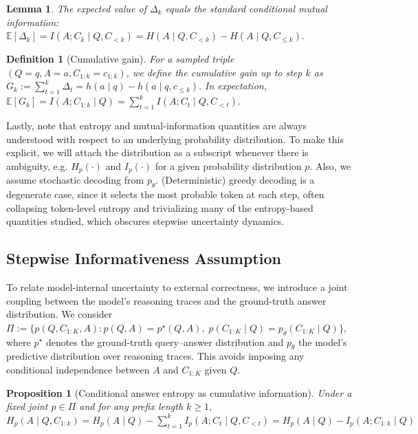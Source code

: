 \documentclass{article}
\newtheorem{proposition}{Proposition}
\newtheorem{definition}{Definition}
\newtheorem{lemma}{Lemma}
\begin{document}
\begin{lemma}
The expected value of $\Delta_k$ equals the standard conditional mutual information: $\mathbb{E}[\Delta_k] = I(A; C_k \mid Q, C_{<k}) = H(A \mid Q, C_{<k}) - H(A \mid Q, C_{\le k}).$
\label{cl:exp_delta_is_I}
\end{lemma}

\begin{definition}[Cumulative gain]
    For a sampled triple $(Q=q,A=a,C_{1:k}=c_{1:k})$, we define the \emph{cumulative gain up to step $k$} as $G_k := \sum_{t=1}^k \Delta_t=h(a\mid q)-h(a\mid q,c_{\leq k}).$ In expectation, $\mathbb{E}[G_k]=I(A;C_{1:k} \mid Q)=\sum_{t=1}^k I(A;C_t \mid Q, C_{<t}).$
    \label{def:cumulativegain}
\end{definition}

Lastly, note that entropy and mutual-information quantities are always understood with respect to an underlying probability distribution. To make this explicit, we will attach the distribution as a subscript whenever there is ambiguity, e.g. $H_{p}(\cdot)$ and $I_{p}(\cdot)$ for a given probability distribution $p$. Also, we assume stochastic decoding from $p_\theta$. (Deterministic) greedy decoding is a degenerate case, since it selects the most probable token at each step, often collapsing token-level entropy and trivializing many of the entropy-based quantities studied, which obscures stepwise uncertainty dynamics.

\subsection{Stepwise Informativeness Assumption}

To relate model-internal uncertainty to external correctness, we introduce a joint coupling between the model’s reasoning traces and the ground-truth answer distribution. We consider
\(
\Pi := \{p(Q,C_{1:K},A) : p(Q,A)=p^\star(Q,A),\; p(C_{1:K}\mid Q)=p_\theta(C_{1:K}\mid Q)\},
\)
where $p^\star$ denotes the ground-truth query–answer distribution and $p_\theta$ the model’s predictive distribution over reasoning traces. This avoids imposing any conditional independence between $A$ and $C_{1:K}$ given $Q$.

\begin{proposition}[Conditional answer entropy as cumulative information]
\label{prop:entropy-information}
Under a fixed joint $p\in \Pi$ and for any prefix length $k \ge 1$,
\(
H_p(A \mid Q, C_{1:k})
=
H_p(A \mid Q) - \sum_{t=1}^k I_p(A; C_t \mid Q, C_{<t})
=
H_p(A \mid Q) - I_p(A; C_{1:k} \mid Q)
\)
\end{proposition}
\end{document}
